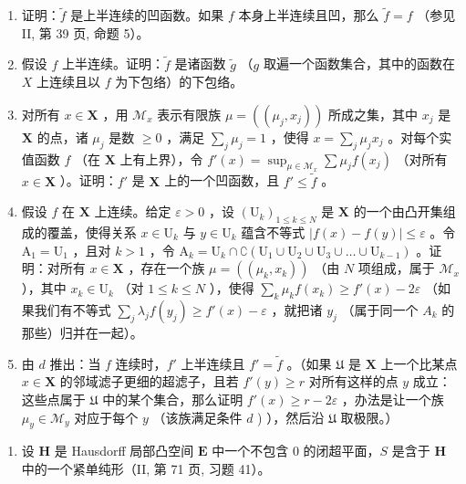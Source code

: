 \begin{enumerate}
\def\labelenumi{\alph{enumi})}
\item
  证明：\(\tilde{f}\) 是上半连续的凹函数。如果 \(f\) 本身上半连续且凹，那么 \(\tilde{f} = f\) （参见 II, 第 39 页, 命题 5）。
\item
  假设 \(f\) 上半连续。证明：\(\tilde{f}\) 是诸函数 \(\tilde{g}\) （\(g\) 取遍一个函数集合，其中的函数在 \(X\) 上连续且以 \(f\) 为下包络）的下包络。
\item
  对所有 \(x \in \mathbf{X}\) ，用 \(\mathcal{M}_x\) 表示有限族 \(\mu = ((\mu_j, x_j))\) 所成之集，其中 \(x_j\) 是 \(\mathbf{X}\) 的点，诸 \(\mu_j\) 是数 \(\geqslant 0\) ，满足 \(\sum_j \mu_j = 1\) ，使得 \(x = \sum_j \mu_j x_j\) 。对每个实值函数 \(f\) （在 \(\mathbf{X}\) 上有上界），令 \(f'(x) = \sup_{\mu \in \mathcal{M}_x} \sum \mu_j f(x_j)\) （对所有 \(x \in \mathbf{X}\) ）。证明：\(f'\) 是 \(\mathbf{X}\) 上的一个凹函数，且 \(f' \leqslant \tilde{f}\) 。
\item
  假设 \(f\) 在 \(\mathbf{X}\) 上连续。给定 \(\varepsilon > 0\) ，设 \((\mathrm{U}_k)_{1 \leqslant k \leqslant N}\) 是 \(\mathbf{X}\) 的一个由凸开集组成的覆盖，使得关系 \(x \in \mathrm{U}_k\) 与 \(y \in \mathrm{U}_k\) 蕴含不等式 \(|f(x) - f(y)| \leqslant \varepsilon\) 。令 \(\mathrm{A}_1 = \mathrm{U}_1\) ，且对 \(k > 1\) ，令 \(\mathrm{A}_k = \mathrm{U}_k \cap \complement(\mathrm{U}_1 \cup \mathrm{U}_2 \cup \mathrm{U}_3 \cup \ldots \cup \mathrm{U}_{k-1})\) 。证明：对所有 \(x \in \mathbf{X}\) ，存在一个族 \(\mu = ((\mu_k, x_k))\) （由 \(N\) 项组成，属于 \(\mathcal{M}_x\) ），其中 \(x_k \in \mathrm{U}_k\) （对 \(1 \leqslant k \leqslant N\) ），使得 \(\sum_k \mu_k f(x_k) \geqslant f'(x) - 2\varepsilon\) （如果我们有不等式 \(\sum_j \lambda_j f(y_j) \geqslant f'(x) - \varepsilon\) ，就把诸 \(y_j\) （属于同一个 \(A_k\) 的那些）归并在一起）。
\item
  由 \(d\) 推出：当 \(f\) 连续时，\(f'\) 上半连续且 \(f' = \tilde{f}\) 。（如果 \(\mathfrak{U}\) 是 \(\mathbf{X}\) 上一个比某点 \(x \in \mathbf{X}\) 的邻域滤子更细的超滤子，且若 \(f'(y) \geqslant r\) 对所有这样的点 \(y\) 成立：这些点属于 \(\mathfrak{U}\) 中的某个集合，那么证明 \(f'(x) \geqslant r - 2\varepsilon\) ，办法是让一个族 \(\mu_y \in \mathcal{M}_y\) 对应于每个 \(y\) （该族满足条件 \(d\) ) ），然后沿 \(\mathfrak{U}\) 取极限。）
\end{enumerate}

\begin{enumerate}
\def\labelenumi{\arabic{enumi})}
\setcounter{enumi}{38}
\tightlist
\item
  设 \(\mathbf{H}\) 是 Hausdorff 局部凸空间 \(\mathbf{E}\) 中一个不包含 0 的闭超平面，\(S\) 是含于 \(\mathbf{H}\) 中的一个紧单纯形（II, 第 71 页, 习题 41）。
\end{enumerate}

